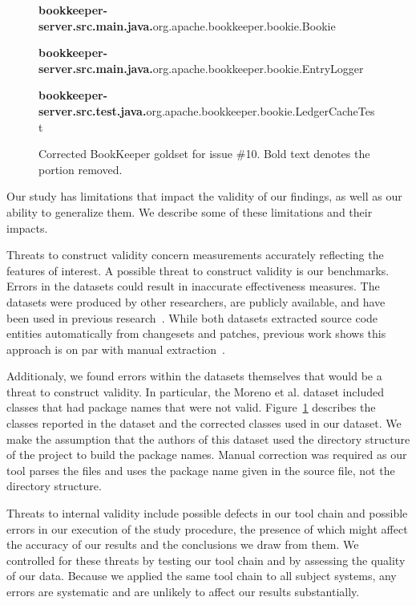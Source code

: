 

\begin{figure}[t]
\footnotesize

{\bf bookkeeper-server.src.main.java.}org.apache.bookkeeper.bookie.Bookie

{\bf bookkeeper-server.src.main.java.}org.apache.bookkeeper.bookie.EntryLogger

{\bf bookkeeper-server.src.test.java.}org.apache.bookkeeper.bookie.LedgerCacheTest

\caption{Corrected BookKeeper goldset for issue \#10. Bold text denotes the portion removed.}
\label{fig:goldsetfix}
\vspace{-10pt}
\end{figure}


Our study has limitations that impact the validity of our findings,
as well as our ability to generalize them.
We describe some of these limitations and their impacts.

Threats to construct validity concern measurements accurately reflecting the features of interest.
A possible threat to construct validity is our benchmarks.
Errors in the datasets could result in inaccurate effectiveness measures.
The datasets were produced by other researchers, are publicly available,
and have been used in previous research~\cite{Dit-etal:2013, Revelle-etal:2010, Moreno-etal:2014}.
While both datasets extracted source code entities automatically from changesets and patches,
previous work shows this approach is on par with manual extraction~\cite{Corley-etal:2011}.

Additionaly, we found errors within the datasets themselves that would be a threat to construct validity.
In particular, the Moreno et al. dataset included classes that had package names that were not valid.
Figure~\ref{fig:goldsetfix} describes the classes reported in the dataset and the corrected classes used in our dataset.
We make the assumption that the authors of this dataset used the directory structure of the project to build the package names.
Manual correction was required as our tool parses the files and uses the package name given in the source file, not the directory structure.

Threats to internal validity include possible defects in our tool chain and possible errors
in our execution of the study procedure,
the presence of which might affect the accuracy of our results and the conclusions we draw from them.
We controlled for these threats by testing our tool chain and by assessing the quality of our data.
Because we applied the same tool chain to all subject systems, any errors are systematic and are unlikely
to affect our results substantially.

